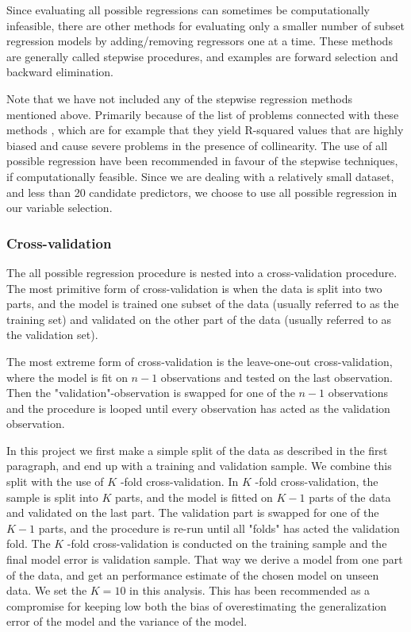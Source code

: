 \documentclass[11pt]{article}
\begin{document}
Since evaluating all possible regressions can sometimes be computationally infeasible, there are other
methods for evaluating only a smaller number of subset regression models by adding/removing regressors one
at a time. These methods are generally called stepwise procedures, and examples are forward selection and backward
elimination. 

Note that we have not included any of the stepwise regression methods mentioned above. Primarily
because of the list of problems connected with these methods \cite{20856}, which are for example that they yield
R-squared values that are highly biased and cause severe problems in the presence of collinearity. 
The use of all possible regression have been recommended in favour of the stepwise techniques, if 
computationally feasible. \cite{Montgomery2012} Since we are dealing with a relatively small dataset, 
and less than 20 candidate predictors, we choose to use all possible regression in our variable selection.

\subsubsection{Cross-validation}
\label{sec:org4568415}

The all possible regression procedure is nested into a cross-validation procedure. The most 
primitive form of cross-validation is when the data is split into two parts, and the model
is trained one subset of the data (usually referred to as the training set) and validated 
on the other part of the data (usually referred to as the validation set).

The most extreme form of cross-validation is the leave-one-out cross-validation, where the model 
is fit on \(n - 1\) observations and tested on the last observation. Then the "validation"-observation 
is swapped for one of the \(n - 1\) observations and the procedure is looped until every observation has acted 
as the validation observation.

In this project we first make a simple split of the data as described in the first paragraph, and 
end up with a training and validation sample. We combine this split with the use of
\(K\) -fold cross-validation. In \(K\) -fold cross-validation, the sample is split into \(K\) parts, and the
model is fitted on \(K - 1\) parts of the data and validated on the last part. The validation part is swapped for one of
the \(K - 1\) parts, and the procedure is re-run until all "folds" has acted the validation fold. The \(K\) -fold
cross-validation is conducted on the training sample and the final model error is validation sample. That
way we derive a model from one part of the data, and get an performance estimate of the chosen model on
unseen data. We set the \(K = 10\) in this analysis. This has been recommended as a compromise for keeping low both the bias of 
overestimating the generalization error of the model and the variance of the model. \cite{hastie2009elements}
\end{document}
